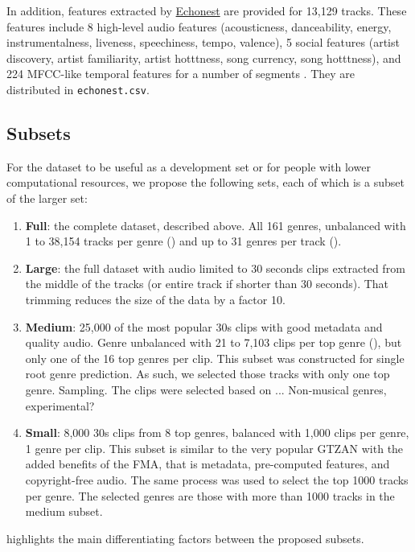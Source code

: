 \documentclass{article}
\newcommand{\todo}[1]{{\color{red} #1}}
\newcommand{\ngenres}{161 }
\begin{document}
In addition,
features extracted by \href{http://the.echonest.com/}{Echonest} are provided for 13,129 tracks. These features include 8 high-level audio features (acousticness, danceability, energy, instrumentalness, liveness, speechiness, tempo, valence), 5 social features (artist discovery, artist familiarity, artist hotttness, song currency, song hotttness), and 224 MFCC-like temporal features for a number of segments \cite{echonest_temporal}. They are distributed in \texttt{echonest.csv}.

\subsection{Subsets} \label{sec:subsets}

For the dataset to be useful as a development set or for people with lower computational resources, we propose the following sets, each of which is a subset of the larger set:
\begin{enumerate}
	\item \textbf{Full}: the complete dataset, described above. All \ngenres genres, unbalanced with 1 to 38,154 tracks per genre () and up to 31 genres per track ().
	\item \textbf{Large}: the full dataset with audio limited to 30 seconds clips extracted from the middle of the tracks (or entire track if shorter than 30 seconds). That trimming reduces the size of the data by a factor 10.
	\item \textbf{Medium}: 25,000 of the most popular 30s clips with good metadata and quality audio. Genre unbalanced with 21 to 7,103 clips per top genre (), but only one of the 16 top genres per clip.
		\todo{This subset was constructed for single root genre prediction. As such, we selected those tracks with only one top genre. Sampling. The clips were selected based on ... Non-musical genres, experimental?}
	\item \textbf{Small}: 8,000 30s clips from 8 top genres, balanced with 1,000 clips per genre, 1 genre per clip. This subset is similar to the very popular GTZAN \cite{gtzan} with the added benefits of the FMA, that is metadata, pre-computed features, and copyright-free audio. \todo{The same process was used to select the top 1000 tracks per genre. The selected genres are those with more than 1000 tracks in the medium subset.}
\end{enumerate}
 highlights the main differentiating factors between the proposed subsets.
\end{document}
